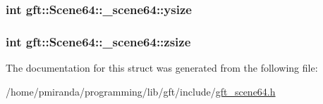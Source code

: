 \subsubsection[{\texorpdfstring{ysize}{ysize}}]{\setlength{\rightskip}{0pt plus 5cm}int gft\+::\+Scene64\+::\+\_\+scene64\+::ysize}\hypertarget{structgft_1_1Scene64_1_1__scene64_a22520a503f545c3f354dec3615b14412}{}\label{structgft_1_1Scene64_1_1__scene64_a22520a503f545c3f354dec3615b14412}
\subsubsection[{\texorpdfstring{zsize}{zsize}}]{\setlength{\rightskip}{0pt plus 5cm}int gft\+::\+Scene64\+::\+\_\+scene64\+::zsize}\hypertarget{structgft_1_1Scene64_1_1__scene64_a66b1037cc070c44c1ba09ac8189c46b3}{}\label{structgft_1_1Scene64_1_1__scene64_a66b1037cc070c44c1ba09ac8189c46b3}


The documentation for this struct was generated from the following file\+:\begin{DoxyCompactItemize}
\item 
/home/pmiranda/programming/lib/gft/include/\hyperlink{gft__scene64_8h}{gft\+\_\+scene64.\+h}\end{DoxyCompactItemize}
